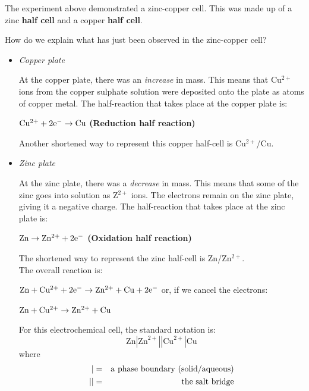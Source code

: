 The experiment above demonstrated a zinc-copper cell. This was made up of a zinc \textbf{half cell} and a copper \textbf{half cell}.


How do we explain what has just been observed in the zinc-copper cell?

\begin{itemize}
\item{\textit{Copper plate}

At the copper plate, there was an \textit{increase} in mass. This means that Cu$^{2+}$ ions from the copper sulphate solution were deposited onto the plate as atoms of copper metal. The half-reaction that takes place at the copper plate is:
\begin{center}
$\rm{Cu^{2+} + 2e^{-} \rightarrow Cu}$ \textbf{(Reduction half reaction)}
\end{center}

Another shortened way to represent this copper half-cell is Cu$^{2+}$/Cu.
}

\item{\textit{Zinc plate}

At the zinc plate, there was a \textit{decrease} in mass. This means that some of the zinc goes into solution as Z$^{2+}$ ions. The electrons remain on the zinc plate, giving it a negative charge. The half-reaction that takes place at the zinc plate is:
\begin{center}
$\rm{Zn \rightarrow Zn^{2+} + 2e^{-}}$ \textbf{(Oxidation half reaction)}
\end{center}

The shortened way to represent the zinc half-cell is Zn/Zn$^{2+}$.\\

The overall reaction is:

\begin{center}
$\rm{Zn + Cu^{2+} + 2e^{-} \rightarrow Zn^{2+} + Cu + 2e^{-}}$ or, if we cancel the electrons:

$\rm{Zn + Cu^{2+} \rightarrow Zn^{2+} + Cu}$ 
\end{center}

For this electrochemical cell, the standard notation is:
\begin{equation*}
\text{Zn}|\text{Zn}^{2+}||\text{Cu}^{2+}|\text{Cu}
\end{equation*}
where
\begin{eqnarray*}
  | &=& \rm{a \ phase \ boundary \ (solid/aqueous)}\\
  || & = & \rm{the \ salt \ bridge}
\end{eqnarray*}
}  
\end{itemize}

